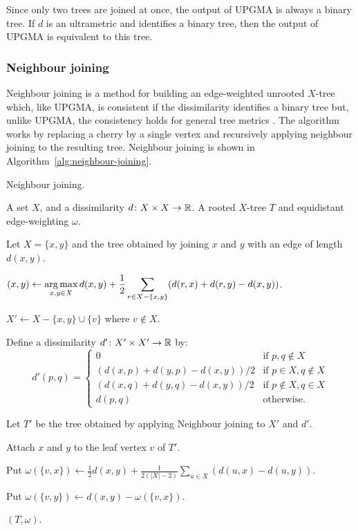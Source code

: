 Since only two trees are joined at once, the output of UPGMA is always a
binary tree.  If $d$ is an ultrametric and identifies a binary tree, then the
output of UPGMA is equivalent to this tree.

\subsubsection{Neighbour joining}
\label{sec:neighbour-joining}

Neighbour joining is a method for building an edge-weighted unrooted $X$-tree
which, like UPGMA, is consistent if the dissimilarity identifies a binary tree
but, unlike UPGMA, the consistency holds for general tree metrics
\cite{saitou1987nj}.  The algorithm works by replacing a cherry by a single
vertex and recursively applying neighbour joining to the resulting tree.
Neighbour joining is shown in Algorithm~\ref{alg:neighbour-joining}.

\begin{algorithm}[h]
  \caption{Neighbour joining.}
  \label{alg:neighbour-joining}

  \begin{algorithmic}
    \Require A set $X$, and a dissimilarity $d \colon X \times X \to {\mathbb R}$.
    \Ensure  A rooted $X$-tree $T$ and equidistant edge-weighting $\omega$.

     Let $X = \{x,y\}$ and \Return the tree obtained by joining
    $x$ and $y$ with an edge of length $d(x,y)$.
    \EndIf

    \State $\displaystyle (x,y) \gets \operatorname*{arg\,max}_{x,y \in X} d(x,y) + \frac{1}{2}
    \sum_{r \in X - \{x,y\}} (d(r,x)+d(r,y)-d(x,y))$.

    \State $X' \gets X - \{x,y\} \cup \{v\}$ where $v \notin X$.

    \State Define a dissimilarity $d' \colon X' \times X' \to {\mathbb R}$ by:
    \begin{equation*}
      d'(p,q) =
      \begin{cases}
        0 & \text{if $p,q \notin X$} \\
        (d(x,p)+d(y,p)-d(x,y))/2 & \text{if $p \in X, q \notin X$} \\
        (d(x,q)+d(y,q)-d(x,y))/2 & \text{if $p \notin X, q \in X$} \\
        d(p,q) & \text{otherwise.}
      \end{cases}
    \end{equation*}

    \State Let $T'$ be the tree obtained by applying Neighbour joining to $X'$
    and $d'$.

    \State Attach $x$ and $y$ to the leaf vertex $v$ of $T'$.

    \State Put $\displaystyle \omega(\{v,x\}) \gets \frac{1}{2} d(x,y) +
    \frac{1}{2(|X|-2)} \sum_{u \in X} (d(u,x)-d(u,y))$.

    \State Put $\omega(\{v,y\}) \gets d(x,y) - \omega(\{v,x\})$.

    \State \Return $(T,\omega)$.
  \end{algorithmic}
\end{algorithm}

